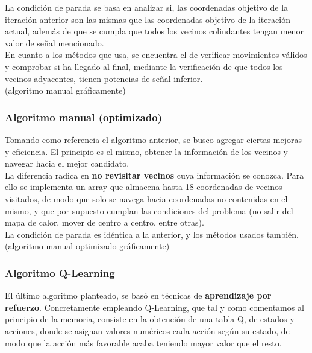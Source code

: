 La condición de parada se basa en analizar si, las coordenadas objetivo de la iteración anterior son las mismas que las coordenadas objetivo de la iteración actual, además de que se cumpla que todos los vecinos colindantes tengan menor valor de señal mencionado.\\

En cuanto a los métodos que usa, se encuentra el de verificar movimientos válidos y comprobar si ha llegado al final, mediante la verificación de que todos los vecinos adyacentes, tienen potencias de señal inferior.\\

(algoritmo manual gráficamente)\\

\subsubsection{Algoritmo manual (optimizado)}
\label{subsec:alg-manual-opt}

Tomando como referencia el algoritmo anterior, se busco agregar ciertas mejoras y eficiencia. El principio es el mismo, obtener la información de los vecinos y navegar hacia el mejor candidato.\\

La diferencia radica en \textbf{no revisitar vecinos} cuya información se conozca. Para ello se implementa un array que almacena hasta 18 coordenadas de vecinos visitados, de modo que solo se navega hacia coordenadas no contenidas en el mismo, y que por supuesto cumplan las condiciones del problema (no salir del mapa de calor, mover de centro a centro, entre otras).\\

La condición de parada es idéntica a la anterior, y los métodos usados también.\\

(algoritmo manual optimizado gráficamente)\\

\subsubsection{Algoritmo Q-Learning}
\label{subsec:alg-q}

El último algoritmo planteado, se basó en técnicas de \textbf{aprendizaje por refuerzo}. Concretamente empleando Q-Learning, que tal y como comentamos al principio de la memoria, consiste en la obtención de una tabla Q, de estados y acciones, donde se asignan valores numéricos cada acción según su estado, de modo que la acción más favorable acaba teniendo mayor valor que el resto.\\

